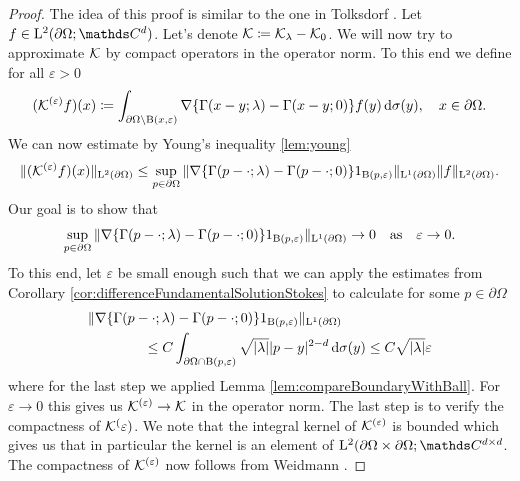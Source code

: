 \begin{proof}
  The idea of this proof is similar to the one in Tolksdorf \cite[Lemma 4.3.5]{tolksdorf}.
  Let $f \in \Ell^2(\partial\Omega; \C^d)$.
  Let's denote $\mathcal{K} \coloneqq \mathcal{K}_\lambda - \mathcal{K}_0$. 
  We will now try to approximate $\mathcal{K}$ by compact operators in the operator norm.
  To this end we define for all $\varepsilon > 0$
  \begin{align*}
    (\mathcal{K}^{(\varepsilon)}f)(x) \coloneqq \int_{\partial\Omega \setminus \mathrm{B}(x,\varepsilon)} \nabla \{ \Gamma(x - y; \lambda) - \Gamma(x - y; 0) \} f(y) \, {\operatorname{d}\!{\sigma}}(y), \quad x \in \partial\Omega.
  \end{align*}
  We can now estimate by Young's inequality \ref{lem:young} 
  \begin{align*}
    \| (\mathcal{K}^{(\varepsilon)} f)(x) \|_{\mathrm{L}^2(\partial\Omega)}
    \leq \sup_{p \in \partial\Omega} \| \nabla \{ \Gamma(p - \cdot; \lambda) - \Gamma(p - \cdot; 0) \} 1_{\mathrm{B}(p,\varepsilon)} \|_{\mathrm{L}^1(\partial\Omega)} \|f\|_{\mathrm{L}^2(\partial\Omega)}.
  \end{align*}
  Our goal is to show that
  \begin{align*}
    \sup_{p \in \partial\Omega} \| \nabla \{ \Gamma(p - \cdot; \lambda) - \Gamma(p - \cdot; 0) \} 1_{\mathrm{B}(p,\varepsilon)} \|_{\mathrm{L}^1(\partial\Omega)} \to 0 \quad \text{as} \quad \varepsilon \to 0.
  \end{align*}
  To this end, let $\varepsilon$ be small enough such that we can apply the estimates from Corollary \ref{cor:differenceFundamentalSolutionStokes} to calculate for some $p \in \partial\Omega$
  \begin{align*}
     &\| \nabla \{ \Gamma(p - \cdot; \lambda) - \Gamma(p - \cdot; 0) \} 1_{\mathrm{B}(p,\varepsilon)} \|_{\mathrm{L}^1(\partial\Omega)}  \\
     &\qquad\qquad\leq C \int_{\partial\Omega \cap \mathrm{B}(p, \varepsilon)} \sqrt{|\lambda|} |p - y|^{2 - d} \, {\operatorname{d}\!{\sigma}}(y) 
     \leq C \sqrt{|\lambda|} \varepsilon
  \end{align*}
  where for the last step we applied Lemma \ref{lem:compareBoundaryWithBall}.
  For $\varepsilon \to 0$ this gives us $\mathcal{K}^{(\varepsilon)} \to \mathcal{K}$ in the operator norm.
  The last step is to verify the compactness of $\mathcal{K}^(\varepsilon)$.
  We note that the integral kernel of $\mathcal{K}^{(\varepsilon)}$ is bounded which gives us that in particular the kernel is an element of $\Ell^2(\partial\Omega \times \partial\Omega; \C^{d \times d}$.
  The compactness of $\mathcal{K}^{(\varepsilon)}$ now follows from Weidmann \cite[Thm. 6.11]{weidmann}.
\end{proof}

